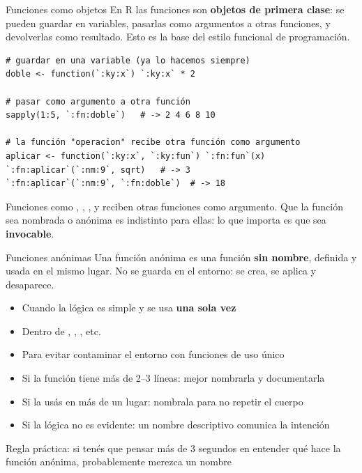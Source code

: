 \documentclass[8pt]{beamer}
\begin{document}
	\begin{frame}[fragile]{Funciones como objetos}
		En R las funciones son \textbf{objetos de primera clase}: se pueden guardar en variables, pasarlas como argumentos a otras funciones, y devolverlas como resultado. Esto es la base del estilo funcional de programación.

\begin{lstlisting}[style=RScript]
# guardar en una variable (ya lo hacemos siempre)
doble <- function(`:ky:x`) `:ky:x` * 2

# pasar como argumento a otra función
sapply(1:5, `:fn:doble`)   # -> 2 4 6 8 10

# la función "operacion" recibe otra función como argumento
aplicar <- function(`:ky:x`, `:ky:fun`) `:fn:fun`(x)
`:fn:aplicar`(`:nm:9`, sqrt)   # -> 3
`:fn:aplicar`(`:nm:9`, `:fn:doble`)  # -> 18
\end{lstlisting}

		\begin{block}{}
			Funciones como , , ,  y  reciben otras funciones como argumento. Que la función sea nombrada o anónima es indistinto para ellas: lo que importa es que sea \textbf{invocable}.
		\end{block}
	\end{frame}


	\begin{frame}[fragile]{Funciones anónimas}
		Una función anónima es una función \textbf{sin nombre}, definida y usada en el mismo lugar. No se guarda en el entorno: se crea, se aplica y desaparece.

		\begin{itemize}
			\item Cuando la lógica es simple y se usa \textbf{una sola vez}
			\item Dentro de , , , etc.
			\item Para evitar contaminar el entorno con funciones de uso único
		\end{itemize}

		\begin{itemize}
			\item Si la función tiene más de 2--3 líneas: mejor nombrarla y documentarla
			\item Si la usás en más de un lugar: nombrala para no repetir el cuerpo
			\item Si la lógica no es evidente: un nombre descriptivo comunica la intención
		\end{itemize}

		\begin{exampleblock}{}
			Regla práctica: si tenés que pensar más de 3 segundos en entender qué hace la función anónima, probablemente merezca un nombre 
		\end{exampleblock}
	\end{frame}
\end{document}
